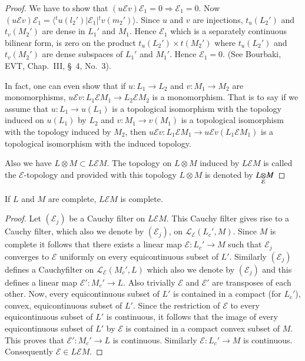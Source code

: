 \begin{proof}
We have to show that $(u \mathcal{E} v) \mathscr{E}_1 = 0 \Rightarrow
\mathscr{E}_1 = 0$. Now $(u \mathcal{E} v) \mathscr{E}_1 = \langle
{}^tu(l_2')|\mathscr{E}_1|{}^tv(m_2')\rangle$. Since $u$ and $v$ are
injections, $t_u(L_2')$ and $t_v(M_2')$ are dense in $L_1'$ and
$M_1$. Hence $\mathscr{E}_1$ which is a separately continuous bilinear
form, is zero on the product $t_u(L_2')\times t (M_2')$ where $t_u
(L_2')$ and $t_v (M_2')$ are dense subspaces of $L_1'$ and
$M_1'$. Hence $\mathscr{E}_1 =0$. (See Bourbaki, EVT, Chap.~III,
\S~4, No.~3). 

In fact, one can even show that if $u : L_1 \to L_2$ and $v : M_1 \to
M_2$ are monomorphisms, $u \mathcal{E} v : L_1 \mathcal{E} M_1 \to L_2
\mathcal{E} M_2$ is a monomorphism. That is to say if we assume that
$u : L_1 \to u(L_1)$ is a topological isomorphism with the topology
induced on $u(L_1)$ by $L_2$ and $v : M_1 \to v(M_1)$ is a topological
isomorphism with the topology induced by $M_2$, then $u \mathcal{E} v
: L_1 \mathcal{E} M_1 \to u \mathcal{E} v(L_1 \mathcal{E} M_1)$ is a
topological isomorphism with the induced topology.

Also we have $L \otimes M \subset L \mathcal{E} M$. The topology on $L
\otimes M$ induced by $L \mathcal{E} M$ is called the
$\mathcal{E}$-topology and provided with this topology $L \otimes M$
is denoted by $\fibreoproduct{L}{M}{\mathcal{E}}$ 
\end{proof}

\begin{prop}\label{chap4:prop4.4}
If $L$ and $M$ are complete, $L \mathcal{E} M$ is complete.
\end{prop}

\begin{proof}
Let $(\mathscr{E}_j)$ be a Cauchy filter on $L \mathcal{E} M$. This
Cauchy filter gives rise to a Cauchy filter, which also we denote by
$(\mathscr{E}_j)$, on $\mathscr{L}_{\mathcal{E}}(L_c', M)$. 
Since $M$ is complete it
follows that there exists a linear map $\mathscr{E} : L_c' \to M$ such
that $\mathscr{E}_j$ converges to $\mathscr{E}$ uniformly on every
equicontinuous subset of $L'$. Similarly $(\mathscr{E}_j)$ defines a
Cauchy\pageoriginale filter on $\mathscr{L}_\mathcal{E} (M_c', L)$
which also we denote by $(\mathscr{E}_j)$ and this defines a linear
map $\mathscr{E}' : M_c' \to L$. Also trivially $\mathscr{E}$ and
$\mathscr{E}'$ are transposes of each other. Now, every equicontinuous
subset of $L'$ is contained in a compact (for $L_c'$), convex,
equicontinuous subset of $L'$. Since the restriction of $\mathscr{E}$
to every equicontinuous subset of $L'$ is continuous, it follows that the
image of every equicontinuous subset of $L'$ by $\mathscr{E}$ is
contained in a compact convex subset of $M$. This proves that
$\mathscr{E}' : M_c' \to L$ is continuous. Similarly $\mathscr{E} :
L_c' \to M$ is continuous. Consequently $\mathscr{E} \in L \mathcal{E}M$.     
\end{proof}
